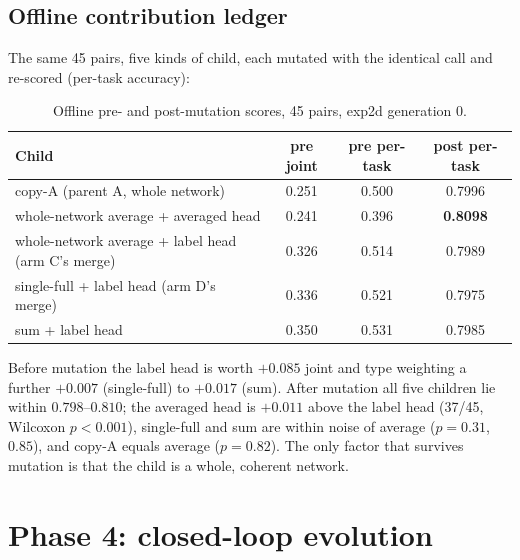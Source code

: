 \documentclass[11pt,a4paper]{article}
\begin{document}
\subsection{Offline contribution ledger}
\label{sec:ledger}
The same 45 pairs, five kinds of child, each mutated with the identical call and re-scored (per-task accuracy):
\begin{table}[h]
\centering\small
\caption{Offline pre- and post-mutation scores, 45 pairs, exp2d generation 0.}
\label{tab:ledger}
\begin{tabular}{lccc}
\toprule
Child & pre joint & pre per-task & post per-task \\
\midrule
copy-A (parent A, whole network) & 0.251 & 0.500 & 0.7996 \\
whole-network average + averaged head & 0.241 & 0.396 & \textbf{0.8098} \\
whole-network average + label head (arm C's merge) & 0.326 & 0.514 & 0.7989 \\
single-full + label head (arm D's merge) & 0.336 & 0.521 & 0.7975 \\
sum + label head & 0.350 & 0.531 & 0.7985 \\
\bottomrule
\end{tabular}
\end{table}
Before mutation the label head is worth $+0.085$ joint and type weighting a further $+0.007$ (single-full) to $+0.017$ (sum). After mutation all five children lie within $0.798$--$0.810$; the averaged head is $+0.011$ above the label head (37/45, Wilcoxon $p<0.001$), single-full and sum are within noise of average ($p=0.31$, $0.85$), and copy-A equals average ($p=0.82$). The only factor that survives mutation is that the child is a whole, coherent network.

\section{Phase 4: closed-loop evolution}
\label{sec:phase4}
\end{document}
